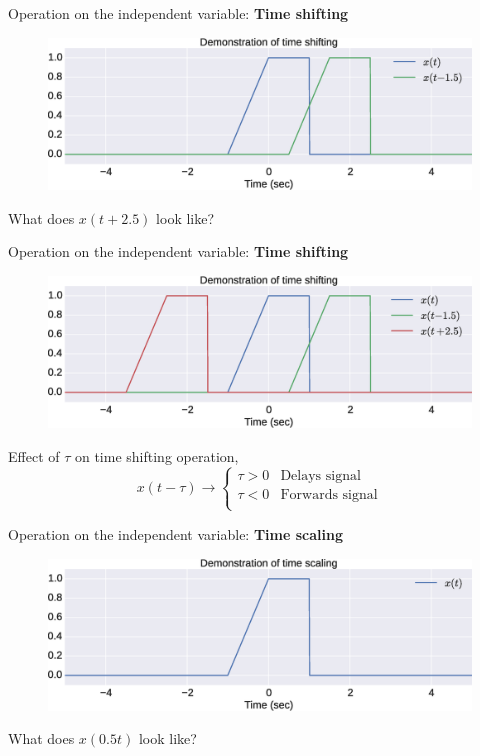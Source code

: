 \documentclass{beamer}
\begin{document}
\begin{frame}{Operation on the independent variable: \textbf{Time shifting}}

\begin{figure}
\includegraphics[width=\textwidth]{img/tshift1.eps}
\end{figure}

What does $x(t+2.5)$ look like?

\end{frame}

\begin{frame}{Operation on the independent variable: \textbf{Time shifting}}

\begin{figure}
\includegraphics[width=\textwidth]{img/tshift2.eps}
\end{figure}

Effect of $\tau$ on time shifting operation,
\[
x(t-\tau) \longrightarrow \begin{cases}
\tau > 0 & \text{Delays signal} \\
\tau < 0 & \text{Forwards signal} \\
\end{cases}
\]
\end{frame}

\begin{frame}{Operation on the independent variable: \textbf{Time scaling}}

\begin{figure}
\includegraphics[width=\textwidth]{img/tscale0.eps}
\end{figure}

What does $x(0.5t)$ look like?

\end{frame}
\end{document}
